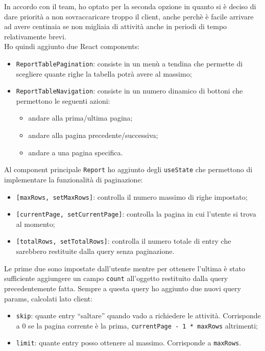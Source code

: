 In accordo con il team, ho optato per la seconda opzione in quanto si è deciso di dare priorità a non sovraccaricare troppo il client, anche perchè è facile arrivare ad avere centinaia se non migliaia di attività anche in periodi di tempo relativamente brevi. \\
Ho quindi aggiunto due React components:
\begin{itemize}
  \item \texttt{ReportTablePagination}: consiste in un menù a tendina che permette di scegliere quante righe la tabella potrà avere al massimo;
  \item \texttt{ReportTableNavigation}: consiste in un numero dinamico di bottoni che permettono le seguenti azioni:
  \begin{itemize}
    \item andare alla prima/ultima pagina;
    \item andare alla pagina precedente/successiva;
    \item andare a una pagina specifica.
  \end{itemize}
\end{itemize}

Al component principale \texttt{Report} ho aggiunto degli \texttt{useState} che permettono di implementare la funzionalità di paginazione:
\begin{itemize}
  \item \texttt{[maxRows, setMaxRows]}: controlla il numero massimo di righe impostato;
  \item \texttt{[currentPage, setCurrentPage]}: controlla la pagina in cui l'utente si trova al momento;
  \item \texttt{[totalRows, setTotalRows]}: controlla il numero totale di entry che sarebbero restituite dalla query senza paginazione.
\end{itemize}
Le prime due sono impostate dall'utente mentre per ottenere l'ultima è stato sufficiente aggiungere un campo \texttt{count} all'oggetto restituito dalla query precedentemente fatta. Sempre a questa query ho aggiunto due nuovi query params, calcolati lato client:
\begin{itemize}
  \item \texttt{skip}: quante entry ``saltare'' quando vado a richiedere le attività. Corrisponde a 0 se la pagina corrente è la prima, \texttt{currentPage - 1 * maxRows} altrimenti;
  \item \texttt{limit}: quante entry posso ottenere al massimo. Corrisponde a \texttt{maxRows}.
\end{itemize}

